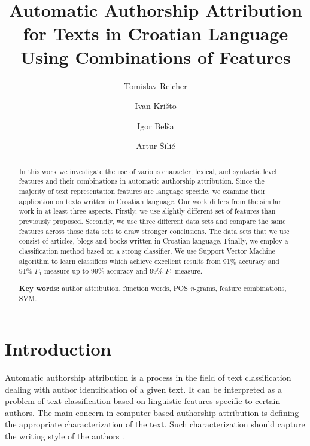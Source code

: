 \documentclass{llncs}
\begin{document}
\title{Automatic Authorship Attribution\\ for Texts in Croatian Language\\ Using
Combinations of Features}
\author{Tomislav Reicher \and Ivan Krišto \and Igor Belša \and Artur Šilić}

\maketitle

\begin{abstract}
In this work we investigate the use of various character, lexical, and syntactic
level features and their combinations in automatic authorship attribution. Since
the majority of text representation features are language specific, we examine
their application on texts written in Croatian language. Our work differs from
the similar work in at least three aspects. Firstly, we use slightly different
set of features than previously proposed. Secondly, we use three different
data sets and compare the same features across those data sets to draw stronger
conclusions. The data sets that we use consist of articles, blogs and books
written in Croatian language. Finally, we employ a classification method based on
a strong classifier. We use Support Vector Machine algorithm to learn classifiers
which achieve excellent results from 91\% accuracy and 91\% $F_1$ measure up to
99\% accuracy and 99\% $F_1$ measure.

\vspace{10pt}
\textbf{Key words:} author attribution, function words, POS \emph{n}-grams,
feature combinations, SVM.
\end{abstract}


\section{Introduction}
Automatic authorship attribution is a process in the field of text classification
dealing with author identification of a given text. It can be interpreted
as a problem of text classification based on linguistic features specific to certain
authors. The main concern in computer-based authorship attribution is defining
the appropriate characterization of the text. Such characterization should
capture the writing style of the authors \cite{coyotl2006authorship}.
\end{document}
